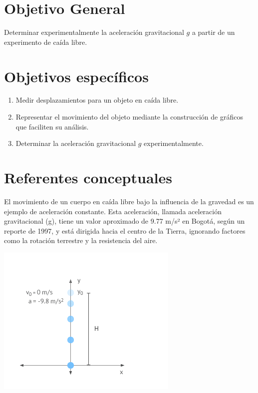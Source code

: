 \begin{multicols}{2}
\section*{Objetivo General}
\normalsize{Determinar experimentalmente la aceleración gravitacional $g$ a partir de un experimento de caída libre.}\\
\section*{Objetivos específicos}
\begin{enumerate}
    \item Medir desplazamientos para un objeto en caída libre.
    \item Representar el movimiento del objeto mediante la construcción de gráficos que faciliten su análisis.
    \item Determinar la aceleración gravitacional $g$ experimentalmente.
\end{enumerate} 
\section*{Referentes conceptuales}
El movimiento de un cuerpo en caída libre bajo la influencia de la gravedad es un ejemplo de aceleración constante. Esta aceleración, llamada aceleración gravitacional (g), tiene un valor aproximado de 9.77 m/s² en Bogotá, según un reporte de 1997, y está dirigida hacia el centro de la Tierra, ignorando factores como la rotación terrestre y la resistencia del aire.

\begin{center}
    \includegraphics[scale=0.5]{fig/caida-libre.png}
\end{center}


\end{multicols}
